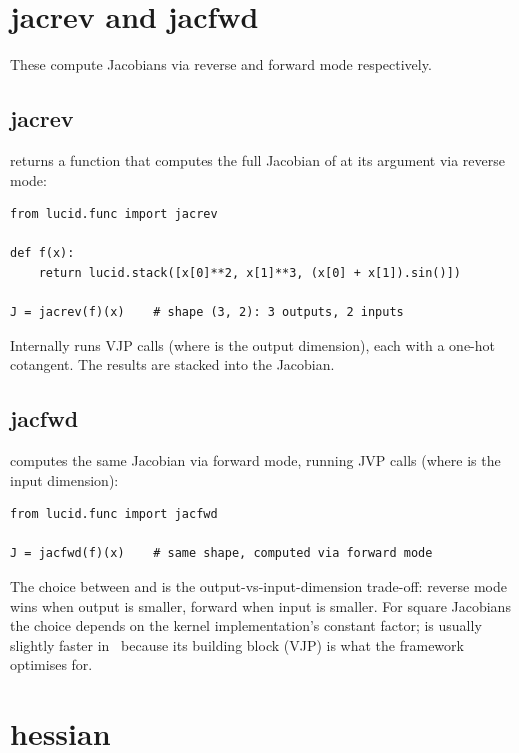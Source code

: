 \section{jacrev and jacfwd}
\label{sec:higher_order:jacrev_jacfwd}

These compute Jacobians via reverse and forward mode
respectively.

\subsection{jacrev}
\label{ssec:higher_order:jacrev}

 returns a function that computes the full
Jacobian of  at its argument via reverse mode:

\begin{lstlisting}[style=lucid,language=LucidPython]
from lucid.func import jacrev

def f(x):
    return lucid.stack([x[0]**2, x[1]**3, (x[0] + x[1]).sin()])

J = jacrev(f)(x)    # shape (3, 2): 3 outputs, 2 inputs
\end{lstlisting}

Internally  runs  VJP calls (where 
is the output dimension), each with a one-hot cotangent. The
results are stacked into the Jacobian.

\subsection{jacfwd}
\label{ssec:higher_order:jacfwd}

 computes the same Jacobian via forward mode,
running  JVP calls (where  is the input dimension):

\begin{lstlisting}[style=lucid,language=LucidPython]
from lucid.func import jacfwd

J = jacfwd(f)(x)    # same shape, computed via forward mode
\end{lstlisting}

The choice between  and  is the
output-vs-input-dimension trade-off: reverse mode wins when
output is smaller, forward when input is smaller. For square
Jacobians the choice depends on the kernel implementation's
constant factor;  is usually slightly faster in
\Lucid\ because its building block (VJP) is what the framework
optimises for.

\section{hessian}
\label{sec:higher_order:hessian}

